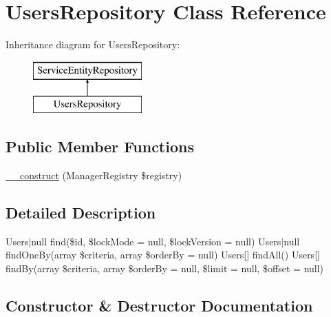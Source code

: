 \hypertarget{class_app_1_1_repository_1_1_users_repository}{}\section{Users\+Repository Class Reference}
\label{class_app_1_1_repository_1_1_users_repository}
Inheritance diagram for Users\+Repository\+:\begin{figure}[H]
\begin{center}
\leavevmode
\includegraphics[height=2.000000cm]{class_app_1_1_repository_1_1_users_repository}
\end{center}
\end{figure}
\subsection*{Public Member Functions}
\begin{DoxyCompactItemize}
\item 
\mbox{\hyperlink{class_app_1_1_repository_1_1_users_repository_a38ea33dde11163765f358f5f10a3bc03}{\+\_\+\+\_\+construct}} (Manager\+Registry \$registry)
\end{DoxyCompactItemize}


\subsection{Detailed Description}
Users$\vert$null find(\$id, \$lock\+Mode = null, \$lock\+Version = null)  Users$\vert$null find\+One\+By(array \$criteria, array \$order\+By = null)  Users\mbox{[}\mbox{]} find\+All()  Users\mbox{[}\mbox{]} find\+By(array \$criteria, array \$order\+By = null, \$limit = null, \$offset = null) 

\subsection{Constructor \& Destructor Documentation}
\mbox{\label{class_app_1_1_repository_1_1_users_repository_a38ea33dde11163765f358f5f10a3bc03}} 
